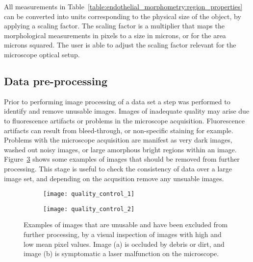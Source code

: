 All measurements in Table~\ref{table:endothelial_morphometry:region_properties} can be converted into units corresponding to the physical size of the object, by applying a scaling factor. The scaling factor is a multiplier that maps the morphological measurements in pixels to a size in microns, or for the area microns squared. The user is able to adjust the scaling factor relevant for the microscope optical setup.

\subsection{Data pre-processing}
\label{endothelial_morphometry:image_processing:quality_control}
Prior to performing image processing of a data set a step was performed to identify and remove unusable images. Images of inadequate quality may arise due to fluorescence artifacts or problems in the microscope acquisition. Fluorescence artifacts can result from bleed-through, or non-specific staining for example. Problems with the microscope acquisition are manifest as very dark images, washed out noisy images, or large amorphous bright regions within an image. Figure~\ref{figure:image_processing:quality_control} shows some examples of images that should be removed from further processing. This stage is useful to check the consistency of data over a large image set, and depending on the acqusition remove any unsuable images.

\begin{figure}[htbp]\centering
	\begin{subfigure}[b]{0.49\linewidth} %
		\centering
		\texttt{[image: quality\_control\_1]}
		\caption{}
		\label{figure:image_processing:quality_control_1}
		\vspace{1ex} \end{subfigure} \begin{subfigure}[b]{0.49\linewidth} %
		\centering
		\texttt{[image: quality\_control\_2]}
		\caption{}
		\label{figure:image_processing:quality_control_2}
		\vspace{1ex}
	\end{subfigure}
\caption[Examples of images excluded from high-throughput analysis]{Examples of images that are unusable and have been excluded from further processing, by a visual inspection of images with high and low mean pixel values. Image (a) is occluded by debris or dirt, and image (b) is symptomatic a laser malfunction on the microscope.}
\label{figure:image_processing:quality_control}
\end{figure}

